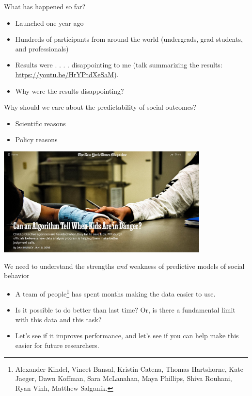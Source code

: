 \documentclass{beamer}
\begin{document}
\begin{frame}

What has happened so far?\\ \pause
\begin{itemize}
\item Launched one year ago \pause
\item Hundreds of participants from around the world (undergrads, grad students, and professionals) \pause
\item Results were . . . . disappointing to me (talk summarizing the results: \textcolor{blue}{\url{https://youtu.be/HrYPtdXeSaM}}). \pause
\item Why were the results disappointing?
\end{itemize}

\end{frame}
\begin{frame}

Why should we care about the predictability of social outcomes?
\begin{itemize}
\item Scientific reasons \pause
\item Policy reasons
\end{itemize}

\begin{center}
\includegraphics[width=0.8\textwidth]{figures/hurley_can_2018_title}
\end{center}

\vfill

We need to understand the strengths \emph{and} weakness of predictive models of social behavior
\end{frame}
\begin{frame}

\begin{itemize}
\item A team of people\footnote{Alexander Kindel, Vineet Bansal, Kristin Catena, Thomas Hartshorne, Kate Jaeger, Dawn Koffman, Sara McLanahan, Maya Phillips, Shiva Rouhani, Ryan Vinh, Matthew Salganik.} has spent months making the data easier to use. \pause
\item Is it possible to do better than last time? Or, is there a fundamental limit with this data and this task? \pause
\item Let's see if it improves performance, \pause and let's see if you can help make this easier for future researchers.
\end{itemize}

\end{frame}
\end{document}
